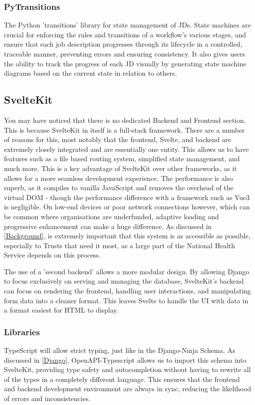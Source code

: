 \subsubsection{PyTransitions}
The Python 'transitions' library for state management of JDs. State machines are crucial for enforcing the rules and transitions of a workflow's various stages, and ensure that each job description progresses through its lifecycle in a controlled, traceable manner, preventing errors and ensuring consistency. It also gives users the ability to track the progress of each JD visually by generating state machine diagrams based on the current state in relation to others.

\subsection{SvelteKit} \label{SvelteKit}
You may have noticed that there is no dedicated Backend and Frontend section. This is because SvelteKit in itself is a full-stack framework. There are a number of reasons for this, most notably that the frontend, Svelte, and backend are extremely closely integrated and are essentially one entity. This allows us to have features such as a file based routing system, simplified state management, and much more. This is a key advantage of SvelteKit over other frameworks, as it allows for a more seamless development experience. The performance is also superb, as it compiles to vanilla JavaScript and removes the overhead of the virtual DOM - though the performance difference with a framework such as Vue3 is negligible. On low-end devices or poor network connections however, which can be common where organisations are underfunded, adaptive loading and progressive enhancement can make a huge difference. As discussed in \ref{Background}, is extremely important that this system is as accessible as possible, especially to Trusts that need it most, as a large part of the National Health Service depends on this process. 

The use of a 'second backend' allows a more modular design. By allowing Django to focus exclusively on serving and managing the database, SvelteKit's backend can focus on rendering the frontend, handling user interactions, and manipulating form data into a cleaner format. This leaves Svelte to handle the UI with data in a format easiest for HTML to display. 

\subsubsection{Libraries}
TypeScript will allow strict typing, just like in the Django-Ninja Schema. As discussed in \ref{Django}, OpenAPI-Typescript allows us to import this schema into SvelteKit, providing type safety and autocompletion without having to rewrite all of the types in a completely different language. This ensures that the frontend and backend development environment are always in sync, reducing the likelihood of errors and inconsistencies. 

